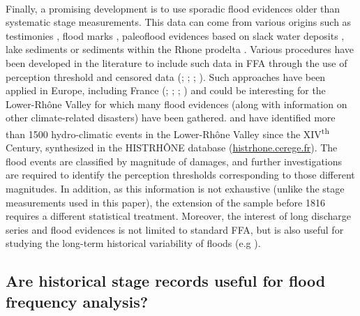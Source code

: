     \paragraph{}
    Finally, a promising development is to use sporadic flood evidences older than systematic stage measurements. This data can come from various origins such as testimonies \citep{pichard_sept_2014}, flood marks \citep{renard_use_2023}, paleoflood evidences based on slack water deposits \citep{sheffer_paleofloods_2003}, lake sediments \citep{wilhelm_reconstructing_2022} or sediments within the Rhone prodelta \citep{fanget_historical_2013}. Various procedures have been developed in the literature to include such data in FFA through the use of perception threshold and censored data (\cite{brazdil_historical_2006}; \cite{kjeldsen_documentary_2014}; \cite{england_guidelines_2019}; \cite{harden_historical_2021}). Such approaches have been applied in Europe, including France (\citet{naulet_flood_2005}; \citet{lang_extrapolation_2010}; \citet{neppel_flood_2010}; \citet{payrastre_usefulness_2011}) and could be interesting for the Lower-Rhône Valley for which many flood evidences (along with information on other climate-related disasters) have been gathered. \citet{pichard_sept_2014} and \citet{pichard_hydro-climatology_2017} have identified more than 1500 hydro-climatic events in the Lower-Rhône Valley since the XIV\textsuperscript{th} Century, synthesized in the HISTRHÔNE database (\url{histrhone.cerege.fr}). The flood events are classified by magnitude of damages, and further investigations are required to identify the perception thresholds corresponding to those different magnitudes. In addition, as this information is not exhaustive (unlike the stage measurements used in this paper), the extension of the sample before 1816 requires a different statistical treatment. Moreover, the interest of long discharge series and flood evidences is not limited to standard FFA, but is also useful for studying the long-term historical variability of floods (e.g \cite{macdonald_high-magnitude_2017}).
  
    \subsection{Are historical stage records useful for flood frequency analysis?}

